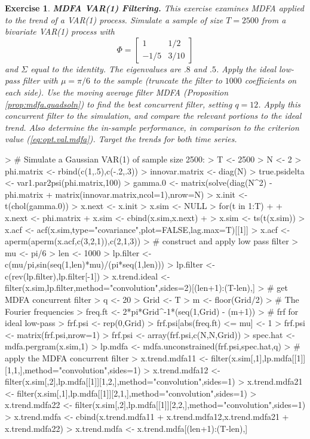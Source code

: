 \documentclass[a4paper]{book}
\newtheorem{Exercise}{Exercise}
\begin{document}
\begin{Exercise} {\bf MDFA VAR(1) Filtering.} \rm
\label{exer:var1mdfa.filter}
 This exercise examines MDFA applied to the trend of a  VAR(1) process.
Simulate a sample of size $T=2500$ from a
 bivariate VAR(1) process with 
\[
  \Phi = \left[ \begin{array}{cc} 1 & 1/2 \\ -1/5 & 3/10 \end{array} \right]
\]
 and $\Sigma$ equal to the identity.  The eigenvalues are $.8$ and $.5$.
  Apply the   ideal low-pass filter  with 
  $\mu = \pi/6$ to the sample (truncate the filter to $1000$ coefficients on each side).  
 Use the moving average filter
 MDFA  (Proposition \ref{prop:mdfa.quadsoln}) to find the best
 concurrent filter, setting $q= 12$. 
 Apply this concurrent filter 
 to the simulation, and compare the relevant portions to the ideal trend.
 Also determine the in-sample performance, in comparison to the criterion value
 (\ref{eq:opt.val.mdfa}).
  Target the trends for both time series.
\end{Exercise}

\begin{Schunk}
\begin{Sinput}
> # Simulate a Gaussian VAR(1) of sample size 2500:
> T <- 2500
> N <- 2
> phi.matrix <- rbind(c(1,.5),c(-.2,.3))
> innovar.matrix <- diag(N)
> true.psidelta <- var1.par2psi(phi.matrix,100)
> gamma.0 <- matrix(solve(diag(N^2) - phi.matrix %
+ 	matrix(innovar.matrix,ncol=1),nrow=N)
> x.init <- t(chol(gamma.0)) %
> x.next <- x.init
> x.sim <- NULL
> for(t in 1:T)
+ {
+ 	x.next <- phi.matrix %
+ 	x.sim <- cbind(x.sim,x.next)
+ }
> x.sim <- ts(t(x.sim))
> x.acf <- acf(x.sim,type="covariance",plot=FALSE,lag.max=T)[[1]]
> x.acf <- aperm(aperm(x.acf,c(3,2,1)),c(2,1,3))
> # construct and apply low pass filter
> mu <- pi/6
> len <- 1000
> lp.filter <- c(mu/pi,sin(seq(1,len)*mu)/(pi*seq(1,len)))
> lp.filter <- c(rev(lp.filter),lp.filter[-1])
> x.trend.ideal <- filter(x.sim,lp.filter,method="convolution",sides=2)[(len+1):(T-len),]
> # get MDFA concurrent filter
> q <- 20
> Grid <- T
> m <- floor(Grid/2)
> # The Fourier frequencies
> freq.ft <- 2*pi*Grid^{-1}*(seq(1,Grid) - (m+1))
> # frf for ideal low-pass
> frf.psi <- rep(0,Grid)
> frf.psi[abs(freq.ft) <= mu] <- 1
> frf.psi <- matrix(frf.psi,nrow=1) %
> frf.psi <- array(frf.psi,c(N,N,Grid))
> spec.hat <- mdfa.pergram(x.sim,1)	
> lp.mdfa <- mdfa.unconstrained(frf.psi,spec.hat,q)
> # apply the MDFA concurrent filter
> x.trend.mdfa11 <- filter(x.sim[,1],lp.mdfa[[1]][1,1,],method="convolution",sides=1)
> x.trend.mdfa12 <- filter(x.sim[,2],lp.mdfa[[1]][1,2,],method="convolution",sides=1)
> x.trend.mdfa21 <- filter(x.sim[,1],lp.mdfa[[1]][2,1,],method="convolution",sides=1)
> x.trend.mdfa22 <- filter(x.sim[,2],lp.mdfa[[1]][2,2,],method="convolution",sides=1)
> x.trend.mdfa <- cbind(x.trend.mdfa11 + x.trend.mdfa12,x.trend.mdfa21 + x.trend.mdfa22)
> x.trend.mdfa <- x.trend.mdfa[(len+1):(T-len),] 
\end{Sinput}
\end{Schunk}
\end{document}
